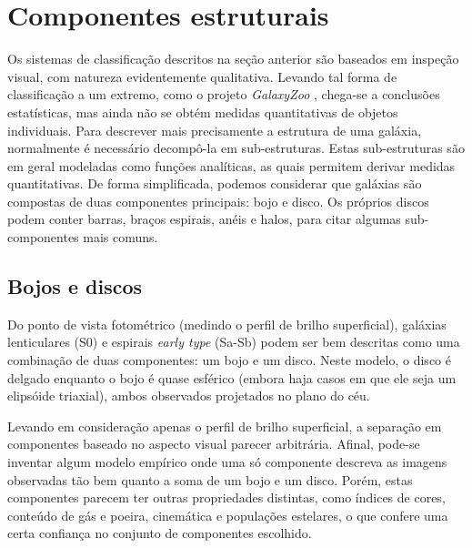 
\section{Componentes estruturais}

Os sistemas de classificação descritos na seção anterior são baseados em
inspeção visual, com natureza evidentemente qualitativa. Levando tal forma de
classificação a um extremo, como o projeto {\em GalaxyZoo} \citep{Lintott2008,
Willett2013}, chega-se a conclusões estatísticas, mas ainda não se obtém medidas
quantitativas de objetos individuais. Para descrever mais precisamente a
estrutura de uma galáxia, normalmente é necessário decompô-la em sub-estruturas.
Estas sub-estruturas são em geral modeladas como funções analíticas, as quais
permitem derivar medidas quantitativas. De forma simplificada, podemos
considerar que galáxias são compostas de duas componentes principais: bojo e
disco. Os próprios discos podem conter barras, braços espirais, anéis e halos,
para citar algumas sub-componentes mais comuns.


\subsection{Bojos e discos}
\label{sec:morph:comp:bd}

Do ponto de vista fotométrico (medindo o perfil de brilho superficial), galáxias
lenticulares (S0) e espirais {\em early type} (Sa-Sb) podem ser bem descritas
como uma combinação de duas componentes: um bojo e um disco. Neste modelo, o
disco é delgado enquanto o bojo é quase esférico (embora haja casos em que ele
seja um elipsóide triaxial), ambos observados projetados no plano do céu.

Levando em consideração apenas o perfil de brilho superficial, a separação em
componentes baseado no aspecto visual parecer arbitrária. Afinal, pode-se
inventar algum modelo empírico onde uma só componente descreva as imagens
observadas tão bem quanto a soma de um bojo e um disco. Porém, estas componentes
parecem ter outras propriedades distintas, como índices de cores, conteúdo de
gás e poeira, cinemática e populações estelares, o que confere uma certa
confiança no conjunto de componentes escolhido.

